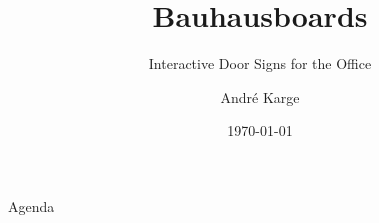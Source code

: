 \documentclass[11pt]{beamer}
\title[Bauhausboards]{Bauhausboards}
\subtitle{Interactive Door Signs for the Office}
\author[André Karge]{André Karge}
\institute[Bauhaus-Universität Weimar]{}
\date[\today]{\today}
\begin{document}

\maketitle

\begin{frame}{Agenda}
\tableofcontents
\end{frame}
\end{document}
